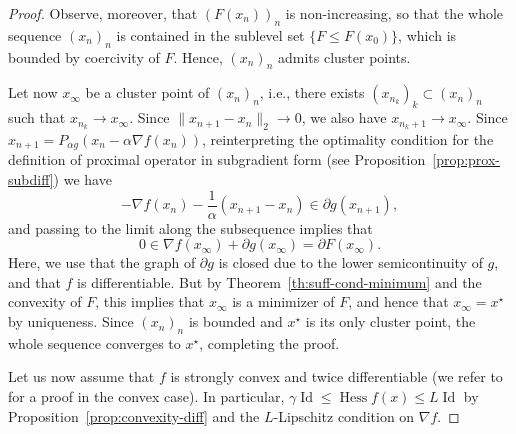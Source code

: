 \begin{proof}
         Observe, moreover, that $(F(x_n))_n$ is non-increasing, so that the whole sequence $(x_n)_n$ is contained in the sublevel set $\{F\le F(x_0)\}$, which is bounded by coercivity of $F$. Hence, $(x_n)_n$ admits cluster points.
 
         Let now $x_\infty$ be a cluster point of $(x_n)_n$, i.e., there exists $(x_{n_k})_k\subset (x_n)_n$ such that $x_{n_k} \rightarrow x_\infty$. Since $\|x_{n+1}-x_n\|_2\to 0$, we also have $x_{n_k+1}\rightarrow x_\infty$.
         Since $x_{n+1}=P_{\alpha g}(x_n-\alpha \nabla f(x_n))$, reinterpreting the optimality condition for the definition of proximal operator in subgradient form (see Proposition~\ref{prop:prox-subdiff}) we have
         \[
             -\nabla f(x_n)-\frac{1}{\alpha}\left(x_{n+1}-x_n\right)\in\partial g(x_{n+1}),
         \]
         and passing to the limit along the subsequence implies that
         \begin{equation}
             0 \in \nabla f(x_\infty)+\partial g(x_\infty) = \partial F(x_\infty).
         \end{equation}
         Here, we use that the graph of $\partial g$ is closed due to the lower semicontinuity of $g$, and that $f$ is differentiable. But by Theorem~\ref{th:suff-cond-minimum} and the convexity of $F$, this implies that $x_\infty$ is a minimizer of $F$, and hence that $x_\infty=x^\star$ by uniqueness. Since $(x_n)_n$ is bounded and $x^\star$ is its only cluster point, the whole sequence converges to $x^\star$, completing the proof.
 
         Let us now assume that $f$ is strongly convex and twice differentiable (we refer to \cite{fawziLecture} for a proof in the convex case). In particular, $\gamma\operatorname{Id}\le \operatorname{Hess}f(x)\le L\operatorname{Id}$ by Proposition~\ref{prop:convexity-diff} and the $L$-Lipschitz condition on $\nabla f$.
 

\end{proof}
